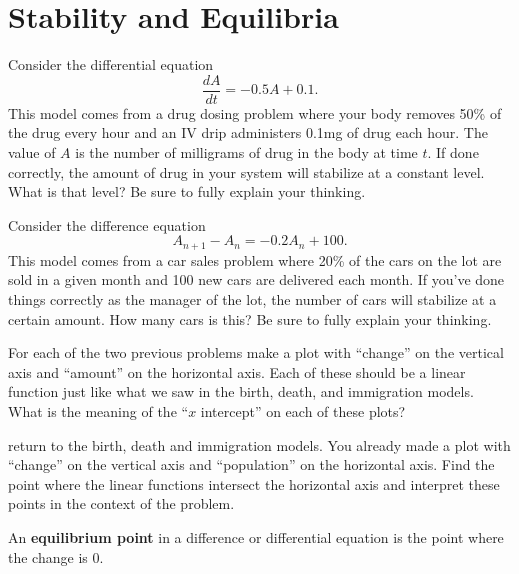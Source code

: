 \newpage\section{Stability and Equilibria}
\begin{problem}
    Consider the differential equation 
    \[ \frac{dA}{dt} = -0.5A + 0.1. \]
    This model comes from a drug dosing problem where your body removes 50\% of the drug
    every hour and an IV drip administers 0.1mg of drug each hour.  The value of $A$ is
    the number of milligrams of drug in the body at time $t$.  If done correctly, the
    amount of drug in your system will stabilize at a constant level.  What is that level?
    Be sure to fully explain your thinking.
\end{problem}

\begin{problem}
    Consider the difference equation
    \[ A_{n+1} - A_n = -0.2 A_n+ 100. \]
    This model comes from a car sales problem where 20\% of the cars on the lot are sold
    in a given month and 100 new cars are delivered each month.  If you've done things
    correctly as the manager of the lot, the number of cars will stabilize at a certain
    amount.  How many cars is this?  Be sure to fully explain your thinking.
\end{problem}

\begin{problem}
    For each of the two previous problems make a plot with ``change'' on the vertical axis
    and ``amount'' on the horizontal axis.  Each of these should be a linear function just
    like what we saw in the birth, death, and immigration models.  What is the meaning of
    the ``$x$ intercept'' on each of these plots?
\end{problem}

\begin{problem}
    return to the birth, death and immigration models.  You already made a plot with
    ``change'' on the vertical axis and ``population'' on the horizontal axis.  Find the
    point where the linear functions intersect the horizontal axis and interpret these
    points in the context of the problem.
\end{problem}

\begin{definition}
    An {\bf equilibrium point} in a difference or differential equation is the point where
    the change is 0.
\end{definition}

